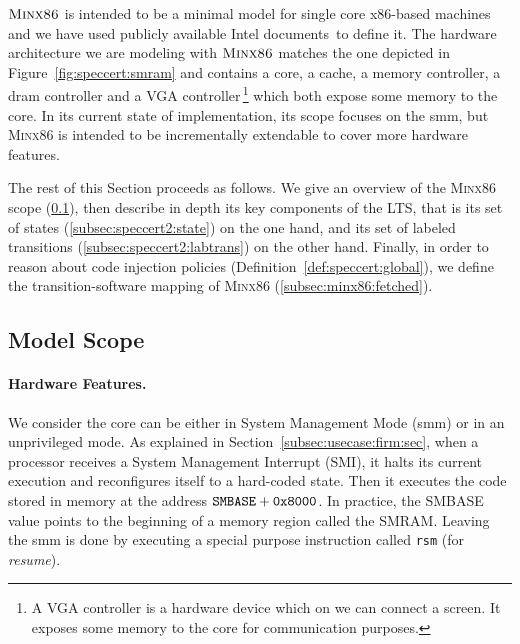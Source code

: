 $\textsc{Minx86}$ is intended to be a minimal model for single core x86-based
machines and we have used publicly available Intel
documents\,\cite{intel2013celeron,intel2009mch,intel2014manual} to define it.
%
The hardware architecture we are modeling with $\textsc{Minx86}$ matches the
one depicted in Figure~\ref{fig:speccert:smram} and contains a core, a cache, a
memory controller, a \ac{dram} controller and a VGA controller\,\footnote{A VGA
  controller is a hardware device which on we can connect a screen. It exposes
  some memory to the core for communication purposes.} which both expose some
memory to the core.
%
In its current state of implementation, its scope focuses on the \ac{smm}, but
{\scshape Minx86} is intended to be incrementally extendable to cover more
hardware features.

The rest of this Section proceeds as follows.
%
We give an overview of the {\scshape Minx86} scope (\ref{sec:speccert2:scope}),
then describe in depth its key components of the LTS, that is its set of states
(\ref{subsec:speccert2:state}) on the one hand, and its set of labeled
transitions (\ref{subsec:speccert2:labtrans}) on the other hand.
%
Finally, in order to reason about code injection policies
(Definition~\ref{def:speccert:global}), we define the transition-software
mapping of {\scshape Minx86} (\ref{subsec:minx86:fetched}).

\subsection{Model Scope}
\label{sec:speccert2:scope}

\paragraph{Hardware Features.}
%
We consider the core can be either in System Management Mode (\ac{smm}) or in an
unprivileged mode.
%
As explained in Section~\ref{subsec:usecase:firm:sec}, when a processor receives
a System Management Interrupt (SMI), it halts its current execution and
reconfigures itself to a hard-coded state.
%
Then it executes the code stored in memory at the address
$\mathtt{SMBASE} + \mathtt{0x8000}$.
%
In practice, the SMBASE value points to the beginning of a memory region called
the SMRAM.
%
Leaving the \ac{smm} is done by executing a special purpose instruction called
\texttt{rsm} (for \emph{resume}).

